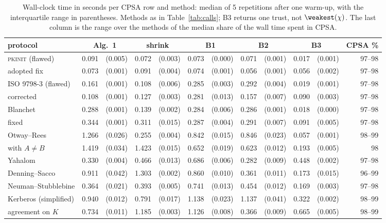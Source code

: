 \begin{table}[tbp]
\caption{Wall-clock time in seconds per CPSA row and method: median of 5 repetitions after one warm-up, with the interquartile range in parentheses. Methods as in Table~\ref{tab:calls}; B3 returns one trust, not $\weakest(\chi)$. The last column is the range over the methods of the median share of the wall time spent in CPSA.}
\label{tab:timing}
\centering
\setlength{\tabcolsep}{3pt}
\footnotesize
\begin{tabular}{l r@{\,}l r@{\,}l r@{\,}l r@{\,}l r@{\,}l r}
\toprule
protocol & \multicolumn{2}{c}{Alg.~1} & \multicolumn{2}{c}{shrink} & \multicolumn{2}{c}{B1} & \multicolumn{2}{c}{B2} & \multicolumn{2}{c}{B3} & CPSA \%\\
\midrule
\textsc{pkinit} (flawed) & 0.091 & (0.005) & 0.072 & (0.003) & 0.073 & (0.000) & 0.071 & (0.001) & 0.017 & (0.001) & 97--98\\
\quad adopted fix & 0.073 & (0.001) & 0.091 & (0.004) & 0.074 & (0.001) & 0.056 & (0.001) & 0.056 & (0.002) & 97--98\\
ISO 9798-3 (flawed) & 0.161 & (0.001) & 0.108 & (0.006) & 0.285 & (0.003) & 0.292 & (0.004) & 0.019 & (0.001) & 97--98\\
\quad corrected & 0.108 & (0.001) & 0.127 & (0.003) & 0.281 & (0.013) & 0.157 & (0.007) & 0.090 & (0.003) & 97--98\\
Blanchet & 0.288 & (0.001) & 0.139 & (0.002) & 0.284 & (0.006) & 0.286 & (0.001) & 0.018 & (0.000) & 97--98\\
\quad fixed & 0.344 & (0.001) & 0.311 & (0.015) & 0.287 & (0.004) & 0.291 & (0.007) & 0.091 & (0.005) & 97--98\\
Otway--Rees & 1.266 & (0.026) & 0.255 & (0.004) & 0.842 & (0.015) & 0.846 & (0.023) & 0.057 & (0.001) & 98--99\\
\quad with $A \neq B$ & 1.419 & (0.034) & 1.423 & (0.015) & 0.652 & (0.019) & 0.623 & (0.012) & 0.193 & (0.005) & 98\\
Yahalom & 0.330 & (0.004) & 0.466 & (0.013) & 0.686 & (0.006) & 0.282 & (0.009) & 0.448 & (0.002) & 97--98\\
Denning--Sacco & 0.911 & (0.042) & 1.303 & (0.002) & 0.860 & (0.010) & 0.361 & (0.011) & 0.173 & (0.015) & 96--99\\
Neuman--Stubblebine & 0.364 & (0.021) & 0.393 & (0.005) & 0.741 & (0.013) & 0.454 & (0.012) & 0.169 & (0.003) & 97--98\\
Kerberos (simplified) & 0.940 & (0.012) & 0.791 & (0.017) & 1.138 & (0.023) & 1.137 & (0.041) & 0.322 & (0.002) & 98--99\\
\quad agreement on $K$ & 0.734 & (0.011) & 1.185 & (0.003) & 1.126 & (0.008) & 0.366 & (0.009) & 0.665 & (0.005) & 98--99\\
\bottomrule
\end{tabular}
\end{table}
